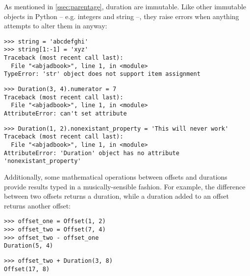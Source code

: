 \noindent As mentioned in \autoref{ssec:parentage}, duration are immutable.
Like other immutable objects in Python -- e.g. integers and string --, they
raise errors when anything attempts to alter them in anyway:

\begin{comment}
<abjad>[allow_exceptions]
string = 'abcdefghi'
string[1:-1] = 'xyz'
Duration(3, 4).numerator = 7
Duration(1, 2).nonexistant_property = 'This will never work'
</abjad>
\end{comment}

\begin{abjadbookoutput}
\begin{singlespacing}
\vspace{-0.5\baselineskip}
\begin{verbatim}
>>> string = 'abcdefghi'
>>> string[1:-1] = 'xyz'
Traceback (most recent call last):
  File "<abjadbook>", line 1, in <module>
TypeError: 'str' object does not support item assignment
\end{verbatim}
\begin{verbatim}
>>> Duration(3, 4).numerator = 7
Traceback (most recent call last):
  File "<abjadbook>", line 1, in <module>
AttributeError: can't set attribute
\end{verbatim}
\begin{verbatim}
>>> Duration(1, 2).nonexistant_property = 'This will never work'
Traceback (most recent call last):
  File "<abjadbook>", line 1, in <module>
AttributeError: 'Duration' object has no attribute 'nonexistant_property'
\end{verbatim}
\end{singlespacing}
\end{abjadbookoutput}

\noindent Additionally, some mathematical operations between offsets and
durations provide results typed in a musically-sensible fashion. For example,
the difference between two offsets returns a duration, while a duration added
to an offset returns another offset:

\begin{comment}
<abjad>
offset_one = Offset(1, 2)
offset_two = Offset(7, 4)
offset_two - offset_one
offset_two + Duration(3, 8)
</abjad>
\end{comment}

\begin{abjadbookoutput}
\begin{singlespacing}
\vspace{-0.5\baselineskip}
\begin{verbatim}
>>> offset_one = Offset(1, 2)
>>> offset_two = Offset(7, 4)
>>> offset_two - offset_one
Duration(5, 4)
\end{verbatim}
\begin{verbatim}
>>> offset_two + Duration(3, 8)
Offset(17, 8)
\end{verbatim}
\end{singlespacing}
\end{abjadbookoutput}

